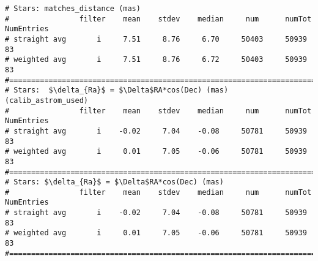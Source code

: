 \begin{verbatim}
# Stars: matches_distance (mas)
#                filter    mean    stdev    median     num      numTot  NumEntries
# straight avg       i     7.51     8.76     6.70     50403     50939        83
# weighted avg       i     7.51     8.76     6.72     50403     50939        83
#================================================================================
# Stars:  $\delta_{Ra}$ = $\Delta$RA*cos(Dec) (mas) (calib_astrom_used)
#                filter    mean    stdev    median     num      numTot  NumEntries
# straight avg       i    -0.02     7.04    -0.08     50781     50939        83
# weighted avg       i     0.01     7.05    -0.06     50781     50939        83
#================================================================================
# Stars: $\delta_{Ra}$ = $\Delta$RA*cos(Dec) (mas)
#                filter    mean    stdev    median     num      numTot  NumEntries
# straight avg       i    -0.02     7.04    -0.08     50781     50939        83
# weighted avg       i     0.01     7.05    -0.06     50781     50939        83
#================================================================================
\end{verbatim}
